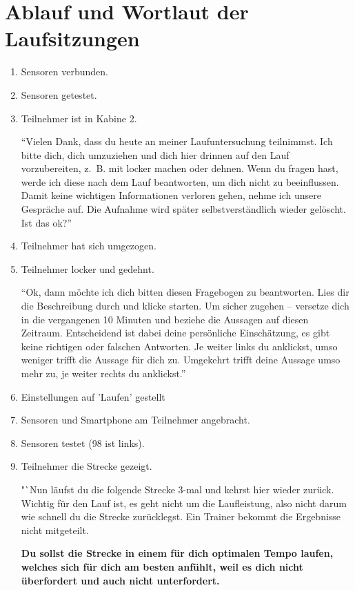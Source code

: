 \section{Ablauf und Wortlaut der  Laufsitzungen} 
\begin{enumerate}
\item Sensoren verbunden.
\item Sensoren getestet. 
\item Teilnehmer ist in Kabine 2. 

"`Vielen Dank, dass du heute an meiner Laufuntersuchung teilnimmst. Ich bitte dich, dich umzuziehen und dich hier drinnen auf den Lauf vorzubereiten, z.~B. mit locker machen oder dehnen. Wenn du fragen hast, werde ich diese nach dem Lauf beantworten, um dich nicht zu beeinflussen. Damit keine wichtigen Informationen verloren gehen, nehme ich unsere Gespräche auf. Die Aufnahme wird später selbstverständlich wieder gelöscht. Ist das ok?"'

\item Teilnehmer hat sich umgezogen. 
\item Teilnehmer locker und gedehnt. 

"`Ok, dann möchte ich dich bitten diesen Fragebogen zu beantworten. Lies dir die Beschreibung durch und klicke starten. Um sicher zugehen – versetze dich in die vergangenen 10 Minuten und beziehe die Aussagen auf diesen Zeitraum. Entscheidend ist dabei deine persönliche Einschätzung, es gibt keine richtigen oder falschen Antworten. Je weiter links du anklickst, umso weniger trifft die Aussage für dich zu. Umgekehrt trifft deine Aussage umso mehr zu, je weiter rechts du anklickst."' 

\item Einstellungen auf 'Laufen' gestellt
\item Sensoren und Smartphone am Teilnehmer angebracht. 
\item Sensoren testet (98 ist links). 
\item Teilnehmer die Strecke gezeigt. 

"`Nun läufst du die folgende Strecke 3-mal und kehrst hier wieder zurück. Wichtig für den Lauf ist, es geht nicht um die Laufleistung, also nicht darum wie schnell du die Strecke zurücklegst. Ein Trainer bekommt die Ergebnisse nicht mitgeteilt. 

\textbf{Du sollst die Strecke in einem für dich optimalen Tempo laufen, welches sich für dich am besten anfühlt, weil es dich nicht überfordert und auch nicht unterfordert.}


\end{enumerate}
